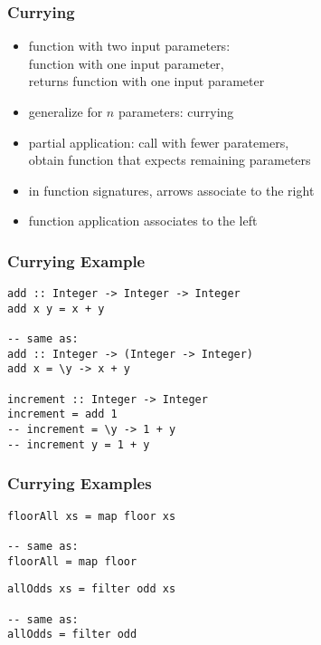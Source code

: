 \documentclass[dvipsnames]{beamer}
\theoremstyle{plain}
\begin{document}
\begin{frame}
  \frametitle{Currying}

  \begin{itemize}
    \item function with two input parameters:\\
      function with one input parameter,\\
      returns function with one input parameter
    \item generalize for $n$ parameters: \alert{currying}

    \pause
    \bigskip
    \item \alert{partial application}: call with fewer paratemers,\\
      obtain function that expects remaining parameters

    \pause
    \medskip
    \item in function signatures, arrows associate to the right
    \item function application associates to the left
  \end{itemize}
\end{frame}

\begin{frame}[fragile]
  \frametitle{Currying Example}

  \begin{lstlisting}
add :: Integer -> Integer -> Integer
add x y = x + y

-- same as:
add :: Integer -> (Integer -> Integer)
add x = \y -> x + y

increment :: Integer -> Integer
increment = add 1
-- increment = \y -> 1 + y
-- increment y = 1 + y
  \end{lstlisting}
\end{frame}

\begin{frame}[fragile]
  \frametitle{Currying Examples}

  \begin{lstlisting}
floorAll xs = map floor xs

-- same as:
floorAll = map floor
  \end{lstlisting}

  \pause
  \medskip
  \begin{lstlisting}
allOdds xs = filter odd xs

-- same as:
allOdds = filter odd
  \end{lstlisting}
\end{frame}
\end{document}
